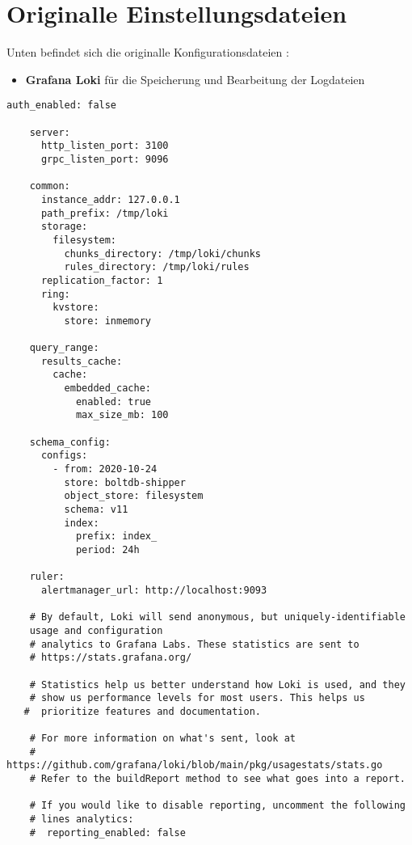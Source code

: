 \section{Originalle Einstellungsdateien}\label{appendix:orgGrafana}

Unten befindet sich die originalle Konfigurationsdateien \citep{GrafanaLoki_run}:

\begin{itemize}[noitemsep]
    \item \textbf{Grafana Loki} für die Speicherung und Bearbeitung der Logdateien
\end{itemize}

{
\begin{Verbatim}[frame=single]
    auth_enabled: false

    server:
      http_listen_port: 3100
      grpc_listen_port: 9096
    
    common:
      instance_addr: 127.0.0.1
      path_prefix: /tmp/loki
      storage:
        filesystem:
          chunks_directory: /tmp/loki/chunks
          rules_directory: /tmp/loki/rules
      replication_factor: 1
      ring:
        kvstore:
          store: inmemory
    
    query_range:
      results_cache:
        cache:
          embedded_cache:
            enabled: true
            max_size_mb: 100
    
    schema_config:
      configs:
        - from: 2020-10-24
          store: boltdb-shipper
          object_store: filesystem
          schema: v11
          index:
            prefix: index_
            period: 24h
    
    ruler:
      alertmanager_url: http://localhost:9093
    
    # By default, Loki will send anonymous, but uniquely-identifiable 
    usage and configuration
    # analytics to Grafana Labs. These statistics are sent to 
    # https://stats.grafana.org/
    
    # Statistics help us better understand how Loki is used, and they 
    # show us performance levels for most users. This helps us
   #  prioritize features and documentation.

    # For more information on what's sent, look at
    # https://github.com/grafana/loki/blob/main/pkg/usagestats/stats.go
    # Refer to the buildReport method to see what goes into a report.
    
    # If you would like to disable reporting, uncomment the following
    # lines analytics:
    #  reporting_enabled: false
\end{Verbatim}
}

